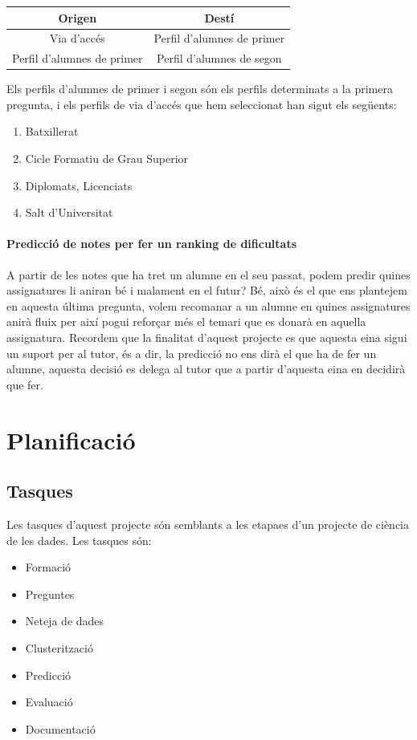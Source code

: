 \documentclass[12pt,a4paper,catalan]{article}
\begin{document}
\begin{table}[h]
\centering
\begin{tabular}{@{}cc@{}}
\toprule
{\bf Origen}               & {\bf Destí}                \\ \midrule
Via d'accés                & Perfil d'alumnes de primer \\
Perfil d'alumnes de primer & Perfil d'alumnes de segon  \\ \bottomrule
\end{tabular}
\end{table}
Els perfils d'alumnes de primer i segon són els perfils determinats a la primera pregunta, i els perfils de via d'accés que hem seleccionat han sigut els següents:
\begin{enumerate}
	\item Batxillerat
	\item Cicle Formatiu de Grau Superior
	\item Diplomats, Licenciats
	\item Salt d'Universitat
\end{enumerate}

\paragraph{Predicció de notes per fer un ranking de dificultats}
A partir de les notes que ha tret un alumne en el seu passat, podem predir quines assignatures li aniran bé i malament en el futur? Bé, això és el que ens plantejem en aquesta última pregunta, volem recomanar a un alumne en quines assignatures anirà fluix per així pogui reforçar més el temari que es donarà en aquella assignatura. Recordem que la finalitat d'aquest projecte es que aquesta eina sigui un suport per al tutor, és a dir, la predicció no ens dirà el que ha de fer un alumne, aquesta decisió es delega al tutor que a partir d'aquesta eina en decidirà que fer.
\newpage

\section{Planificació}
\subsection{Tasques}
Les tasques d'aquest projecte són semblants a les etapaes d'un projecte de ciència de les dades. Les tasques són:
\begin{itemize}[leftmargin=.5in]
	\item Formació
	\item Preguntes
	\item Neteja de dades
	\item Clusterització
	\item Predicció
	\item Evaluació
	\item Documentació
\end{itemize}
\end{document}
